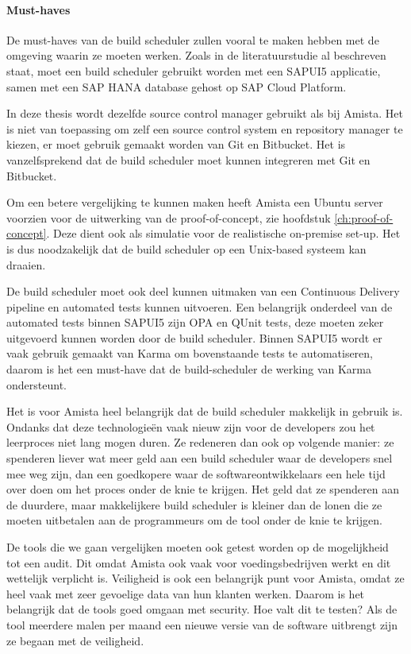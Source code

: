             \paragraph{Must-haves}
            De must-haves van de build scheduler zullen vooral te maken hebben met de omgeving waarin ze moeten werken. Zoals in de literatuurstudie al beschreven staat, moet een build scheduler gebruikt worden met een SAPUI5 applicatie, samen met een SAP HANA database gehost op SAP Cloud Platform.
            
            In deze thesis wordt dezelfde source control manager gebruikt als bij Amista. Het is niet van toepassing om zelf een source control system en repository manager te kiezen, er moet gebruik gemaakt worden van Git en Bitbucket. Het is vanzelfsprekend dat de build scheduler moet kunnen integreren met Git en Bitbucket.

            Om een betere vergelijking te kunnen maken heeft Amista een Ubuntu server voorzien voor de uitwerking van de proof-of-concept, zie hoofdstuk \ref{ch:proof-of-concept}. Deze dient ook als simulatie voor de realistische on-premise set-up. Het is dus noodzakelijk dat de build scheduler op een Unix-based systeem kan draaien.
            
            De build scheduler moet ook deel kunnen uitmaken van een Continuous Delivery pipeline en automated tests kunnen uitvoeren. Een belangrijk onderdeel van de automated tests binnen SAPUI5 zijn OPA en QUnit  tests, deze moeten zeker uitgevoerd kunnen worden door de build scheduler.
            Binnen SAPUI5 wordt er vaak gebruik gemaakt van Karma om bovenstaande tests te automatiseren, daarom is het een must-have dat de build-scheduler de werking van Karma ondersteunt.
            
            Het is voor Amista heel belangrijk dat de build scheduler makkelijk in gebruik is. Ondanks dat deze technologieën vaak nieuw zijn voor de developers zou het leerproces niet lang mogen duren. Ze redeneren dan ook op volgende manier: ze spenderen liever wat meer geld aan een build scheduler waar de developers snel mee weg zijn, dan een goedkopere waar de softwareontwikkelaars een hele tijd over doen om het proces onder de knie te krijgen. Het geld dat ze spenderen aan de duurdere, maar makkelijkere build scheduler is kleiner dan de lonen die ze moeten uitbetalen aan de programmeurs om de tool onder de knie te krijgen.
            
            De tools die we gaan vergelijken moeten ook getest worden op de mogelijkheid tot een audit. Dit omdat Amista ook vaak voor voedingsbedrijven werkt en dit wettelijk verplicht is.
            Veiligheid is ook een belangrijk punt voor Amista, omdat ze heel vaak met zeer gevoelige data van hun klanten werken. Daarom is het belangrijk dat de tools goed omgaan met security. Hoe valt dit te testen? Als de tool meerdere malen per maand een nieuwe versie van de software uitbrengt zijn ze begaan met de veiligheid.
            
